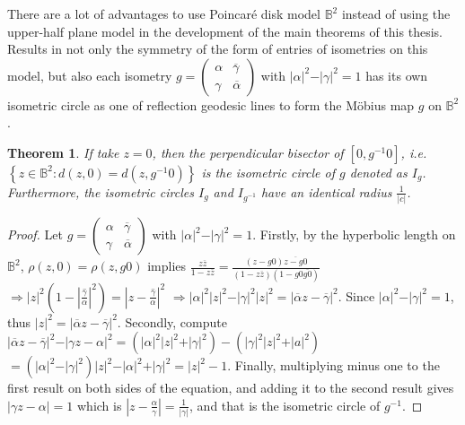 \documentclass[12pt,oneside]{sfsuthesis}
\theoremstyle{plain} %
\newtheorem{theorem}{Theorem}[chapter]
\theoremstyle{definition}  %
\theoremstyle{remark}  %
\theoremstyle{plain}
\begin{document}
{There are a lot of advantages to use Poincar\'{e} disk model $\mathbb{B}^2$ instead of using the upper-half plane model in the development of the main theorems of this thesis. Results in not only the symmetry of the form of entries of isometries on this model, but also each isometry $g=\begin{pmatrix}
\alpha &  \overline{\gamma}\\
\gamma &  \overline{\alpha}
\end{pmatrix}$ with $\vert \alpha\vert^2-\vert \gamma\vert^2=1$ has its own isometric circle as one of reflection geodesic lines to form the M\"{o}bius map $g$ on $\mathbb{B}^2$.
\begin{theorem}\label{Isometric_thm}
If take $z=0$, then the perpendicular bisector of $[0,g^{-1}0]$, i.e. $\left\lbrace z\in\mathbb{B}^2 : d(z,0)=d(z,g^{-1}0)\right\rbrace$ is the isometric circle of $g$ denoted as $I_g$. Furthermore, the isometric circles $I_g$ and $I_{g^{-1}}$ have an identical radius $\frac{1}{\vert c\vert}$.
\end{theorem}
\begin{proof} Let $g=\begin{pmatrix}
\alpha &  \overline{\gamma}\\
\gamma &  \overline{\alpha}
\end{pmatrix}$ with $\vert \alpha\vert^2-\vert \gamma\vert^2=1$. Firstly, by the hyperbolic length on $\mathbb{B}^2$, $\rho(z,0)=\rho(z,g0)$ implies $\frac{z\overline{z}}{1-z\overline{z}}=\frac{(z-g0)\overline{z-g0}}{(1-z\overline{z})(1-g0\overline{g0})}$ $\Rightarrow \vert z\vert^2\left( 1-\left\vert \overline{\frac{\gamma}{\alpha}}\right\vert^2\right)=\left\vert z-\overline{\frac{\gamma}{\alpha}}\right\vert^2$ $\Rightarrow \vert \alpha \vert^2\vert z\vert^2-\vert \gamma\vert^2\vert z\vert^2=\vert \overline{\alpha} z-\overline{\gamma}\vert^2$. Since $\vert \alpha\vert^2-\vert \gamma\vert^2=1$, thus $\vert z\vert^2=\vert \overline{\alpha}z-\overline{\gamma}\vert^2$. Secondly, compute $\vert \overline{\alpha}z-\overline{\gamma}\vert^2 - \vert \gamma z-\alpha\vert^2 = (\vert \alpha\vert^2\vert z\vert^2+\vert \gamma\vert^2)-(\vert \gamma\vert^2\vert z\vert^2+\vert a\vert^2)$ $=(\vert \alpha\vert^2-\vert \gamma\vert^2)\vert z\vert^2-\vert \alpha\vert^2+\vert \gamma\vert^2=\vert z\vert^2-1$. Finally, multiplying minus one to the first result on both sides of the equation, and adding it to the second result gives $\vert \gamma z-\alpha\vert=1$ which is $\left\vert z -\frac{\alpha}{\gamma}\right\vert=\frac{1}{\vert \gamma\vert}$, and that is the isometric circle of $g^{-1}$.
\end{proof}


}
\end{document}
